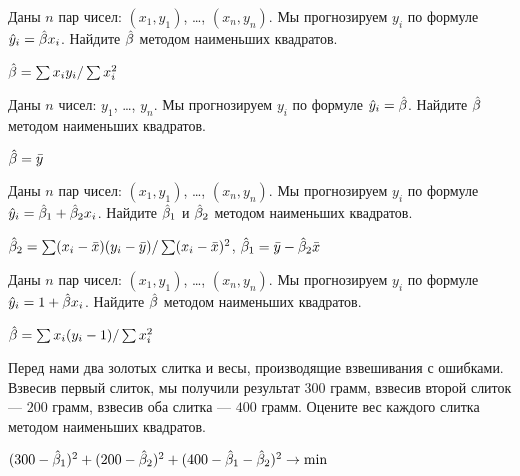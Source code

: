 \documentclass[pdftex,11pt,openany]{book}\usepackage[]{graphicx}\usepackage[]{color}
\begin{document}
\begin{solution}
\end{solution} 
 


\begin{problem}
Даны $n$ пар чисел: $(x_1, y_1)$, \ldots, $(x_n,y_n)$. Мы прогнозируем $y_i$ по формуле $\hat{y}_i=\hat{\beta} x_i$. Найдите $\hat{\beta}$ методом наименьших квадратов. 
\end{problem} 

\begin{solution}
$\hat{\beta}=\sum x_i y_i/\sum x_i^2$
\end{solution}

\begin{problem}
Даны $n$ чисел: $y_1$, \ldots, $y_n$. Мы прогнозируем $y_i$ по формуле $\hat{y}_i=\hat{\beta}$. Найдите $\hat{\beta}$ методом наименьших квадратов. 
\end{problem}
\begin{solution}
$\hat{\beta}=\bar{y}$
\end{solution}

\begin{problem}
Даны $n$ пар чисел: $(x_1, y_1)$, \ldots, $(x_n,y_n)$. Мы прогнозируем $y_i$ по формуле $\hat{y}_i=\hat{\beta}_1+\hat{\beta}_2 x_i$. Найдите $\hat{\beta}_1$ и $\hat{\beta}_2$ методом наименьших квадратов. 
\end{problem}
\begin{solution}
$\hat{\beta}_2=\sum (x_i-\bar{x})(y_i-\bar{y})/\sum(x_i-\bar{x})^2$, $\hat{\beta}_1=\bar{y}-\hat{\beta}_2\bar{x}$
\end{solution}

\begin{problem}
Даны $n$ пар чисел: $(x_1, y_1)$, \ldots, $(x_n,y_n)$. Мы прогнозируем $y_i$ по формуле $\hat{y}_i=1+\hat{\beta} x_i$. Найдите $\hat{\beta}$ методом наименьших квадратов. 
\end{problem}
\begin{solution}
$\hat{\beta}=\sum x_i (y_i-1)/\sum x_i^2$
\end{solution}

\begin{problem}
 Перед нами два золотых слитка и весы, производящие взвешивания с ошибками. Взвесив первый слиток, мы получили результат $300$ грамм, взвесив второй слиток --- $200$ грамм, взвесив оба слитка --- $400$ грамм. Оцените вес каждого слитка методом наименьших квадратов.
 \end{problem}
\begin{solution}
 $(300-\hat{\beta}_1)^2+(200-\hat{\beta}_2)^2+(400-\hat{\beta}_1-\hat{\beta}_2)^2\rightarrow\min$ 
\end{solution}
\end{document}
